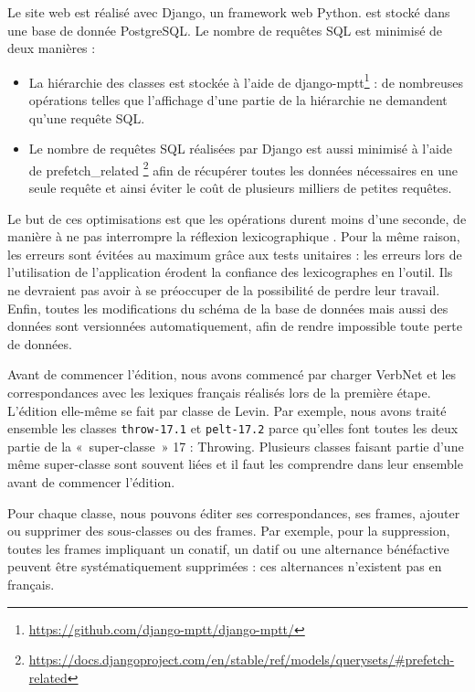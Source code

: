Le site web est réalisé avec Django, un framework web Python. \verbenet{} est
stocké dans une base de donnée PostgreSQL. Le nombre de requêtes SQL est
minimisé de deux manières :
\begin{itemize}
    \item La hiérarchie des classes est stockée à l'aide de
        django-mptt\footnote{\url{https://github.com/django-mptt/django-mptt/}}
        : de nombreuses opérations telles que l'affichage d'une partie de la
        hiérarchie ne demandent qu'une requête SQL.
    \item Le nombre de requêtes SQL réalisées par Django est aussi minimisé à
        l'aide de prefetch\_related
        \footnote{\url{https://docs.djangoproject.com/en/stable/ref/models/querysets/\#prefetch-related}}
        afin de récupérer toutes les données nécessaires en une seule requête
        et ainsi éviter le coût de plusieurs milliers de petites requêtes.
\end{itemize}

Le but de ces optimisations est que les opérations durent moins d'une seconde,
de manière à ne pas interrompre la réflexion lexicographique
\citep{nielsen1994response}. Pour la même raison, les erreurs sont évitées au
maximum grâce aux tests unitaires : les erreurs lors de l'utilisation de
l'application érodent la confiance des lexicographes en l'outil. Ils ne
devraient pas avoir à se préoccuper de la possibilité de perdre leur travail.
Enfin, toutes les modifications du schéma de la base de données mais aussi des
données sont versionnées automatiquement, afin de rendre impossible toute perte
de données.

Avant de commencer l'édition, nous avons commencé par charger VerbNet et les
correspondances avec les lexiques français réalisés lors de la première étape.
L'édition elle-même se fait par classe de Levin. Par exemple, nous avons traité
ensemble les classes {\color{blue}\texttt{throw-17.1}} et
{\color{blue}\texttt{pelt-17.2}} parce qu'elles font toutes les deux partie de
la «~super-classe~» 17 : Throwing.  Plusieurs classes faisant partie d'une même
super-classe sont souvent liées et il faut les comprendre dans leur ensemble
avant de commencer l'édition.

Pour chaque classe, nous pouvons éditer ses correspondances, ses frames,
ajouter ou supprimer des sous-classes ou des frames. Par exemple, pour la
suppression, toutes les frames impliquant un conatif, un datif ou une
alternance bénéfactive peuvent être systématiquement supprimées : ces
alternances n'existent pas en français.


